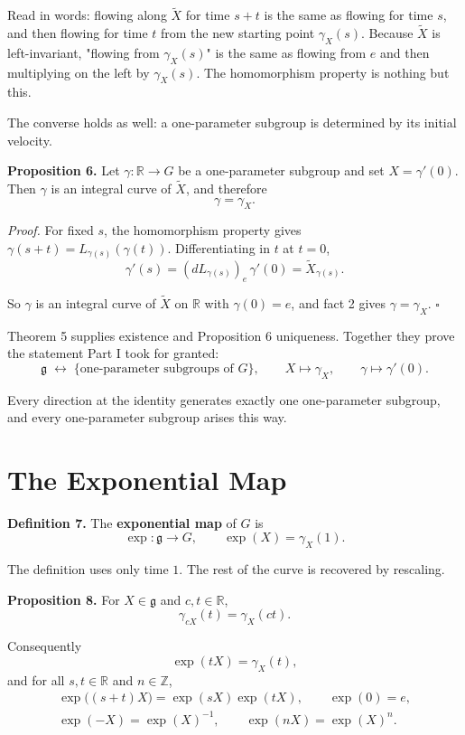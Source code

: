 \documentclass[11pt]{article}
\begin{document}
Read in words: flowing along $\widetilde{X}$ for time $s + t$ is the same as flowing for time $s$, and then flowing for time $t$ from the new starting point $\gamma_X(s)$. Because $\widetilde{X}$ is left-invariant, "flowing from $\gamma_X(s)$" is the same as flowing from $e$ and then multiplying on the left by $\gamma_X(s)$. The homomorphism property is nothing but this.

The converse holds as well: a one-parameter subgroup is determined by its initial velocity.

\textbf{Proposition 6.} Let $\gamma : \mathbb{R} \to G$ be a one-parameter subgroup and set $X = \gamma'(0)$. Then $\gamma$ is an integral curve of $\widetilde{X}$, and therefore
\[
\gamma = \gamma_X.
\]

\emph{Proof.} For fixed $s$, the homomorphism property gives $\gamma(s + t) = L_{\gamma(s)}(\gamma(t))$. Differentiating in $t$ at $t = 0$,
\[
\gamma'(s) = (dL_{\gamma(s)})_e\, \gamma'(0) = \widetilde{X}_{\gamma(s)}.
\]

So $\gamma$ is an integral curve of $\widetilde{X}$ on $\mathbb{R}$ with $\gamma(0) = e$, and fact 2 gives $\gamma = \gamma_X$. $\square$

Theorem 5 supplies existence and Proposition 6 uniqueness. Together they prove the statement Part I took for granted:
\[
\boxed{
\mathfrak{g}
\;\longleftrightarrow\;
\{\text{one-parameter subgroups of } G\},
\qquad
X \longmapsto \gamma_X, \qquad \gamma \longmapsto \gamma'(0).
}
\]

Every direction at the identity generates exactly one one-parameter subgroup, and every one-parameter subgroup arises this way.

\section{The Exponential Map}

\textbf{Definition 7.} The \textbf{exponential map} of $G$ is
\[
\exp : \mathfrak{g} \to G, \qquad \exp(X) = \gamma_X(1).
\]

The definition uses only time $1$. The rest of the curve is recovered by rescaling.

\textbf{Proposition 8.} For $X \in \mathfrak{g}$ and $c, t \in \mathbb{R}$,
\[
\gamma_{cX}(t) = \gamma_X(ct).
\]

Consequently
\[
\boxed{\exp(tX) = \gamma_X(t)},
\]
and for all $s, t \in \mathbb{R}$ and $n \in \mathbb{Z}$,
\[
\begin{gathered}
\exp\bigl((s + t)X\bigr) = \exp(sX) \exp(tX), \qquad \exp(0) = e, \\
\exp(-X) = \exp(X)^{-1}, \qquad \exp(nX) = \exp(X)^n.
\end{gathered}
\]
\end{document}

